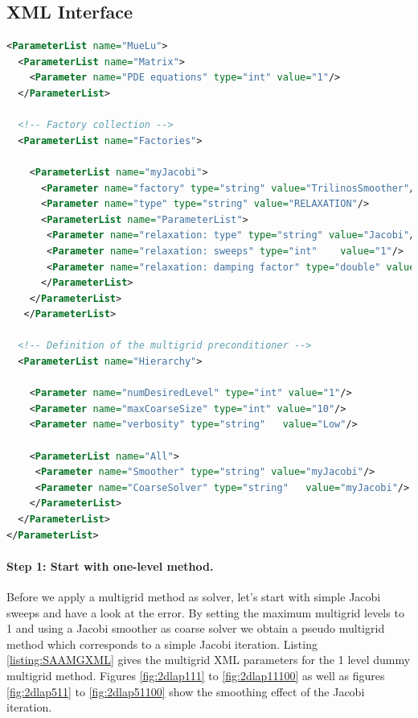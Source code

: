 \documentclass[12pt,a4paper]{article}
\newcommand{\MueLu}{MueLu}
\begin{document}

\subsection{XML Interface}

\begin{Listing}
\begin{center}
\begin{lstlisting}[language=XML,label=listing:SAAMGXML]
<ParameterList name="MueLu">
  <ParameterList name="Matrix">
    <Parameter name="PDE equations" type="int" value="1"/>
  </ParameterList>

  <!-- Factory collection -->
  <ParameterList name="Factories">

    <ParameterList name="myJacobi">
      <Parameter name="factory" type="string" value="TrilinosSmoother"/>
      <Parameter name="type" type="string" value="RELAXATION"/>
      <ParameterList name="ParameterList">
       <Parameter name="relaxation: type" type="string" value="Jacobi"/>
       <Parameter name="relaxation: sweeps" type="int"    value="1"/>
       <Parameter name="relaxation: damping factor" type="double" value="0.9"/>
      </ParameterList>
    </ParameterList>
   </ParameterList>

  <!-- Definition of the multigrid preconditioner -->
  <ParameterList name="Hierarchy">

    <Parameter name="numDesiredLevel" type="int" value="1"/>
    <Parameter name="maxCoarseSize" type="int" value="10"/>
    <Parameter name="verbosity" type="string"   value="Low"/>

    <ParameterList name="All">
     <Parameter name="Smoother" type="string" value="myJacobi"/>
     <Parameter name="CoarseSolver" type="string"   value="myJacobi"/>
    </ParameterList>
  </ParameterList>
</ParameterList>
\end{lstlisting}
\caption{Structure of XML input file for \MueLu~ with smoothed aggregation transfer operators and Jacobi level smoothers.}
\label{listing:SAAMGXML}
\end{center}
\end{Listing}

\paragraph{Step 1: Start with one-level method.}
Before we apply a multigrid method as solver, let's start with simple Jacobi sweeps and have a look at the error.
By setting the maximum multigrid levels to 1 and using a Jacobi smoother as coarse solver we obtain a pseudo multigrid method which corresponds to a simple Jacobi iteration. Listing \ref{listing:SAAMGXML} gives the multigrid XML parameters for the 1 level dummy multigrid method. Figures \ref{fig:2dlap111} to \ref{fig:2dlap11100} as well as figures \ref{fig:2dlap511} to \ref{fig:2dlap51100} show the smoothing effect of the Jacobi iteration.
\end{document}
